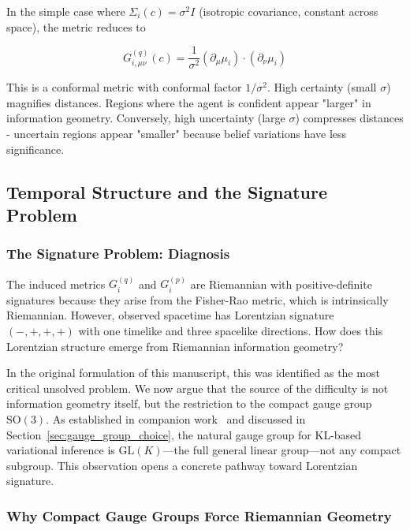 \documentclass[11pt]{article}
\begin{document}
In the simple case where $\Sigma_i(c) = \sigma^2 I$ (isotropic covariance, constant across space), the metric reduces to

\begin{equation}
G^{(q)}_{i,\mu\nu}(c) = \frac{1}{\sigma^2}(\partial_\mu \mu_i) \cdot (\partial_\nu \mu_i)
\end{equation}

This is a conformal metric with conformal factor $1/\sigma^2$. High certainty (small $\sigma$) magnifies distances.  Regions where the agent is confident appear "larger" in information geometry. Conversely, high uncertainty (large $\sigma$) compresses distances - uncertain regions appear "smaller" because belief variations have less significance.

\subsection{Temporal Structure and the Signature Problem}
\label{sec:signature_resolution}

\subsubsection{The Signature Problem: Diagnosis}

The induced metrics $G_i^{(q)}$ and $G_i^{(p)}$ are Riemannian with positive-definite signatures because they arise from the Fisher-Rao metric, which is intrinsically Riemannian. However, observed spacetime has Lorentzian signature $(-,+,+,+)$ with one timelike and three spacelike directions. How does this Lorentzian structure emerge from Riemannian information geometry?

In the original formulation of this manuscript, this was identified as the most critical unsolved problem. We now argue that the source of the difficulty is not information geometry itself, but the restriction to the compact gauge group $\mathrm{SO}(3)$. As established in companion work~\cite{Dennis2026GL} and discussed in Section~\ref{sec:gauge_group_choice}, the natural gauge group for KL-based variational inference is $\mathrm{GL}(K)$---the full general linear group---not any compact subgroup. This observation opens a concrete pathway toward Lorentzian signature.

\subsubsection{Why Compact Gauge Groups Force Riemannian Geometry}
\end{document}

